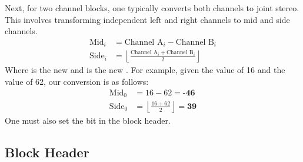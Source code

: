 Next, for two channel blocks, one typically converts both
channels to joint stereo.
This involves transforming independent left and right channels
to mid and side channels.
\begin{align*}
\text{Mid}_i &= \text{Channel A}_i - \text{Channel B}_i \\
\text{Side}_i &= \left\lfloor\frac{\text{Channel A}_i + \text{Channel B}_i}{2}\right\rfloor
\end{align*}
Where  is the new  and  is the new
.
For example, given the  value of 16 and the
 value of 62, our conversion is as follows:
\begin{align*}
\text{Mid}_0 &= 16 - 62 = \textbf{-46} \\
\text{Side}_0 &= \left\lfloor\frac{16 + 62}{2}\right\rfloor = \textbf{39}
\end{align*}
One must also set the  bit in the block header.

\clearpage

\subsection{Block Header}

